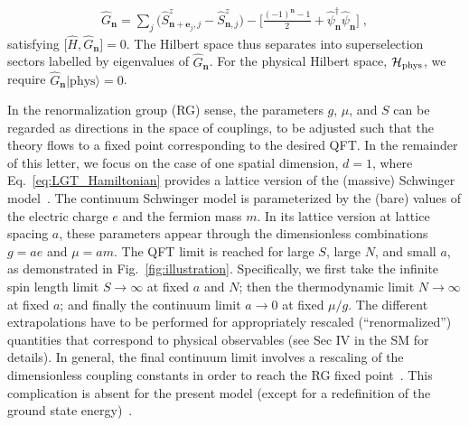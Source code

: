 \documentclass[aps,prl,reprint,twocolumn,superscriptaddress,floatfix,nofootinbib]{revtex4-1}
\begin{document}
	\begin{align}  \label{eq:Glaw}
		\hat{G}_\mathbf{n} =  \sum_j \big(\hat{S}^z_{\mathbf{n}+\mathbf{e}_j,j} - \hat{S}^z_{\mathbf{n},j}\big) - \bigg[ \frac{ (-1)^\mathbf{n} - 1 }{2} +  \hat{\psi}_\mathbf{n}^\dagger\hat{\psi}_\mathbf{n} \bigg] \;,
	\end{align}
	satisfying $\big[\hat{H},\hat{G}_\mathbf{n}\big] = 0$. The Hilbert space thus separates into superselection sectors labelled by eigenvalues of $\hat{G}_\mathbf{n}$. For the physical Hilbert space, $\mathcal{H}_{\rm phys}$, we require $\hat{G}_\mathbf{n}|\text{phys} \rangle = 0$.
	
	In the renormalization group (RG) sense, the parameters $g$, $\mu$, and $S$ can be regarded as directions in the space of couplings, to be adjusted such that the theory flows to a fixed point corresponding to the desired QFT. In the remainder of this letter, we focus on the case of one spatial dimension, $d=1$, where Eq.~\eqref{eq:LGT_Hamiltonian} provides a lattice version of the (massive) Schwinger model~\cite{Schwinger1962, Coleman:1975pw, Coleman:1976uz}. The continuum Schwinger model is parameterized by the (bare) values of the electric charge $e$ and the fermion mass $m$. In its lattice version at lattice spacing $a$, these parameters appear through the dimensionless combinations $g=ae$ and $\mu=am$. The QFT limit is reached for large $S$, large $N$, and small $a$, as demonstrated in Fig.~\ref{fig:illustration}. Specifically, we first take the infinite spin length limit $S\rightarrow \infty$ at fixed $a$ and $N$; then the thermodynamic limit $N \rightarrow \infty$ at fixed $a$; and finally the continuum limit $a \rightarrow 0$ at fixed $\mu/g$. The different extrapolations have to be performed for appropriately rescaled (``renormalized'') quantities that correspond to physical observables (see Sec IV in the SM for details). In general, the final continuum limit involves a rescaling of the dimensionless coupling constants in order to reach the RG fixed point~\cite{montvay1997quantum}. This complication is absent for the present model (except for a redefinition of the ground state energy)~\cite{Coleman:1975pw,abdalla1991non}.
	
\end{document}
